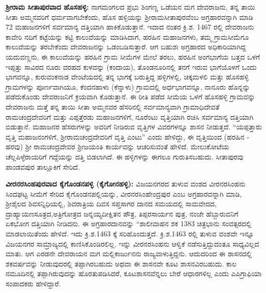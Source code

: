 \textbf{ಶ‍್ರೀರಾಮ ಸೀತಾಪುರವಾದ ಹೊಸಹಳ್ಳಿ:} ನಾಗಮಂಗಲದ ಪ್ರಭು ಶಿಂಗಣ್ಣ ಒಡೆಯನ ಮಗ ದೇವರಾಜನು, ತನ್ನ ತಾಯಿ ಸೀತಾ ಅಮ್ಮನವರಿಗೆ ಧರ್ಮವಾಗಬೇಕೆಂದು, ಹೊಸ ಹಳ್ಳಿಯನ್ನು ಶ‍್ರೀರಾಮಸೀತಾಪುರವೆಂಬ ಅಗ್ರಹಾರವನ್ನಾಗಿ ಮಾಡಿ 72 ಮಹಾಜನಗಳಿಗೆ ಸರ್ವಮಾನ್ಯ ದತ್ತಿಯಾಗಿ ಹಾಕಿಕೊಡುತ್ತಾನೆ. ಇದಾದ ನಂತರ ಕ್ರಿ.ಶ. 1467 ರಲ್ಲಿ ದೇವರಾಜನು ಕಾವೇರಿ ನದಿಗೆ ಕಟ್ಟೆಯನ್ನು ಕಟ್ಟಿ ಕಾಲುವೆಯನ್ನು ಮಾಡಿಸಿದಾಗ, ಹರಹಿನ ಮಹಾಜನಗಳು, ತಮ್ಮ ಗ್ರಾಮಸೀಮೆಗೂ ಕಾಲುವೆಯನ್ನು ತರಬೇಕೆಂದು ದೇವರಾಜನನ್ನು ಒಡಂಬಡಿಸುತ್ತಾರೆ. ಆಗ ಬಹುಶಃ ಅಗ್ರಹಾರದ ಅಧಿಕಾರಿಯಾಗಿದ್ದ ಯದುವಣ್ಣನು, ಈ ಕಾಲುವೆಯನ್ನು ಹರಹಿನ ಗ್ರಾಮ ಸೀಮೆಗಳ ಮೇಲೆ ತರಲು, ಹರಹಿನ ಅಂಗಭಾಗೆಯ ಬತ್ತದ ಒಳಗೆ ಇಪ್ಪತ್ತು ಸಾವಿರದ ನೂರು ವರಹದ ಕುಳವನ್ನು (ಕಂದಾಯ), ತೊಂಡನೂರಿನಲ್ಲಿ ತನಗೆ ಇರುವ ಭಾಗೆಯೊಳಗೆ ಒಂದು ಭಾಗವನ್ನೂ, ಕುರುವಂಕನಾಡ ವೇಂಟೆಯದಲ್ಲಿ ತನ್ನ ಭಾಗಕ್ಕೆ ಬರುತ್ತಿದ್ದ ಹಳ್ಳಿಗಳಲ್ಲಿ, ಚಿಕ್ಕಮಳಲಿ ಮತ್ತು ಹೊಸಹಳ್ಳಿ ಗ್ರಾಮಗಳನ್ನು ಪೂರ್ಣವಾಗಿಯೂ, ಕೆಂದನಹಾಳು (ಕೆನ್ನಾಳು) ಗ್ರಾಮದಲ್ಲಿ ಅರ್ಧಭಾಗವನ್ನೂ, ನಾನೂರು ಹೊನ್ನನ್ನು ಪಡೆದುಕೊಂಡು ದೇವರಾಜನಿಗೆ ಕ್ರಯವಾಗಿ ಕೊಡುತ್ತಾನೆ. ಈ ರೀತಿ ಪಡೆದ ಸೀಮೆಯ ಒಳಗೆ ಹೊಸಹಳ್ಳಿ ಗ್ರಾಮವನ್ನು ದೇವರಾಜನು ಮತ್ತೆ ತನ್ನ ತಾಯಿ ಸೀತಾ ಅಮ್ಮನವರ ಹೆಸರಿನಲ್ಲಿ ಸರ್ವಮಾನ್ಯವಾಗಿ ಗ್ರಾಮಾಧಿದೇವತೆ ರಾಮಚಂದ್ರದೇವರಿಗೆ ಮತ್ತು ಎಪ್ಪತ್ತೆರಡು ಮಹಾಜನಗಳಿಗೆ, ನೂರೆಂಟು ವೃತ್ತಿಯಾಗಿ ರಚಿಸಿ ಸರ್ವಮಾನ್ಯ ದತ್ತಿಯಾಗಿ ಬಿಡುತ್ತಾನೆ. ಮಹಾಜನರ ಹೆಸರುಗಳನ್ನು ಅವರಿಗೆ ನೀಡಿರುವ ವೃತ್ತಿಗಳ ವಿವರಗಳನ್ನೂ ಶಾಸನ ನೀಡುತ್ತದೆ. “ಯಪ್ಪತ್ತಾರು ವೃತ್ತಿ ಮಹಾಜನಂಗಳಿಗೆ, ಶ‍್ರೀರಾಮಚಂದ್ರದೇವರಿಗೆ ವೃತ್ತಿ ಎಂಟು” ಎಂದು ಹೇಳಿದ್ದು, ಈ ವೃತ್ತಿಯಿಂದ (ಹರಹಿನ - ಹರವು) ಶ‍್ರೀ ರಾಮಚಂದ್ರದೇವರ ಶ‍್ರೀಜಯಂತಿ ಕಾರ್ಯವನ್ನು ಆಚರಿಸುವಂತೆ ಹೇಳಿದೆ. ಮೇಲುಕೋಟೆಯ ಚೆಲ್ಲಪಿಳ್ಳೆರಾಯರಿಗೆ ಗದ್ದೆಯನ್ನು ದತ್ತಿ ಬಿಡಲಾಗಿದೆ. ಈ ಹಳ್ಳಿಗಳನ್ನು ಈಗಲೂ ಗುರುತಿಸಬಹುದು. ಸೀತಾಪುರವು ಪಾಂಡವಪುರ ತಾಲ್ಲೂಕಿಗೆ ಸೇರಿದೆ.

\textbf{ವೀರನರಸಿಂಹಪುರವಾದ ಕೈಗೊಂಡನಪಳ್ಳಿ (ಕೈಗೋನಹಳ್ಳಿ):} ವಿಜಯನಗರದ ತುಳುವ ವಂಶದ ವೀರನರಸಿಂಹನು ಸಿಂದಘಟ್ಟ ಸೀಮೆಗೆ ಸೇರಿದ ಕೈಗೊಂಡನಪಲ್ಲಿಯನ್ನು, ವೀರನರಸಿಂಹೇಂದ್ರಪುರ ಎಂಬ ಅಗ್ರಹಾರವನ್ನಾಗಿ ಮಾಡಿ, ಶ‍್ರೀಶೈಲದ ಶಿವಸನ್ನಿಧಿಯಲ್ಲಿ, ಶಿವರಾತ್ರಿಯ ದಿವಸ ಸಪ್ತಸಾಗರ ದಾನದ ಸಮಯದಲ್ಲಿ ಸಾಮವೇದದ, ದ್ರಾಹ್ಯಾಯಣಸೂತ್ರದ,\break ಅತ್ರಿಗೋತ್ರದ ಜನ್ನಯ್ಯದೀಕ್ಷಿತನ ಪೌತ್ರ, ತಿಪ್ಪರಸಾರ್ಯನ ಪುತ್ರ, ನಂಜೇ ಹೆಬ್ಬಾರುವನಿಗೆ ಏಕಭೋಗ ದತ್ತಿಯಾಗಿ ನೀಡಿದನು. ಈ ಅಗ್ರಹಾರದಾನವನ್ನು “ಶಾಲೀವಾಹನ ಶಕ 1383 ಚಿತ್ರಭಾನು ಸಂವತ್ಸರದಲ್ಲಿ ಮಾಡಲಾಯಿತೆಂದು ಹೇಳಿದೆ. ಇದು ಕ್ರಿ.ಶ.1463 ಕ್ಕೆ ಸರಿಹೊಂದುತ್ತದೆ. ಕ್ರಿ.ಶ.1463 ರಲ್ಲಿ ತುಳುವ ವಂಶವೇ ಇನ್ನೂ ವಿಜಯನಗರ ಸಾಮ್ರಾಜ್ಯದಲ್ಲಿ ಕಾಣಿಸಿಕೊಂಡಿರ\-ಲಿಲ್ಲ. ಇನ್ನು ವೀರನರಸಿಂಹನು ಆಳ್ವಿಕೆ ನಡೆಸುತ್ತಿದ್ದುದಂತೂ ಸಾಧ್ಯವಿಲ್ಲದ ಮಾತು. ಆಗ ಎರಡನೇ ದೇವರಾಯನ ಮಗ ಮಲ್ಲಿಕಾರ್ಜುನನು ರಾಜ್ಯವಾಳುತ್ತಿದ್ದನು. ಆದುದರಿಂದ ಈ ಶಾಸನದಲ್ಲಿ ಶಕವರ್ಷವನ್ನು ನೀಡುವುದರಲ್ಲಿ ತಪ್ಪಾಗಿರಬಹುದು ಅಥವಾ ಈ ಶಾಸನವೇ ಕೂಟ ಶಾಸನವಿರಬಹುದು. ಕಾಲ ನಮೂದಿನಲ್ಲಿ ತಪ್ಪಾಗಿರುವುದನ್ನು ಹೊರತುಪಡಿಸಿದರೆ, ಕೂಟಶಾಸನವೆನ್ನಲು ಬೇರೆ ಆಧಾರಗಳಿಲ್ಲ ಎಂದು ಎಪಿಗ್ರಾಫಿಯಾ ಸಂಪಾದಕರು ಹೇಳಿದ್ದಾರೆ.

